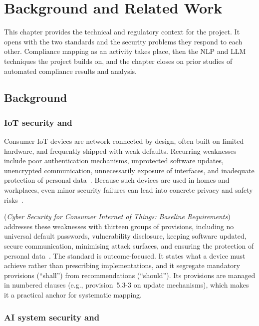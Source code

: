 \chapter{Background and Related Work}\label{ch:background}

This chapter provides the technical and regulatory context for the project. It
opens with the two standards and the security problems they respond to each other. Compliance
mapping as an activity takes place, then the NLP and LLM techniques the project
builds on, and the chapter closes on prior studies of automated compliance
results and analysis.

\section{Background}

\subsection{IoT security and \standardA{}}

Consumer IoT devices are network connected by design, often built on
limited hardware, and frequently shipped with weak defaults. Recurring
weaknesses include poor authentication mechanisms, unprotected software
updates, unencrypted communication, unnecessarily exposure of interfaces, and
inadequate protection of personal data~\cite{sicari2015security,vardakis2024smarthome}. Because such devices are used in homes and workplaces, even minor security failures can lead into concrete
privacy and safety risks~\cite{mocrii2018smarthomes}.

\standardA{} (\textit{Cyber Security for Consumer Internet of Things: Baseline
Requirements}) addresses these weaknesses with thirteen groups of provisions,
including no universal default passwords, vulnerability disclosure, keeping
software updated, secure communication, minimising attack surfaces, and
ensuring the protection of personal data~\cite{etsi303645}. The standard is
outcome-focused. It states what a device must achieve rather than prescribing
implementations, and it segregate mandatory provisions (``shall'') from
recommendations (``should''). Its provisions are managed in numbered clauses
(e.g., provision~5.3-3 on update mechanisms), which makes it a practical anchor
for systematic mapping.

\subsection{AI system security and \standardB{}}

